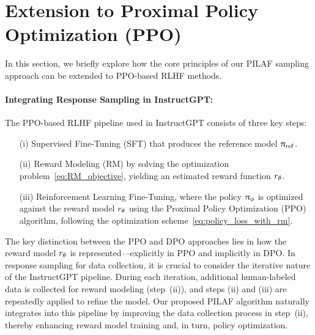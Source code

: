 \section{Extension to Proximal Policy Optimization (PPO)}
\label{app:extension}

In this section, we briefly explore how the core principles of our PILAF sampling approach can be extended to PPO-based RLHF methods.

\paragraph{Integrating Response Sampling in InstructGPT:}

The PPO-based RLHF pipeline used in InstructGPT \citep{ouyang2022training} consists of three key steps: \vspace{-.8em}
\begin{enumerate} \itemsep = -.3em
    \item[(i)] Supervised Fine-Tuning (SFT) that produces the reference model $\uppi_{{\rm ref}}$.
    \item[(ii)] Reward Modeling (RM) by solving the optimization problem~\eqref{eq:RM_objective}, yielding an estimated reward function $r_{\theta}$.
    \item[(iii)] Reinforcement Learning Fine-Tuning, where the policy $\uppi_{\phi}$ is optimized against the reward model $r_{\theta}$ using the Proximal Policy Optimization (PPO) algorithm, following the optimization scheme~\eqref{eq:policy_loss_with_rm}.
\end{enumerate}
\vspace{-.8em}
The key distinction between the PPO and DPO approaches lies in how the reward model $ r_{\theta} $ is represented—explicitly in PPO and implicitly in DPO.
In response sampling for data collection, it is crucial to consider the iterative nature of the InstructGPT pipeline. During each iteration, additional human-labeled data is collected for reward modeling (step~(ii)), and steps (ii) and (iii) are repeatedly applied to refine the model. Our proposed PILAF algorithm naturally integrates into this pipeline by improving the data collection process in step~(ii), thereby enhancing reward model training and, in turn, policy optimization.

